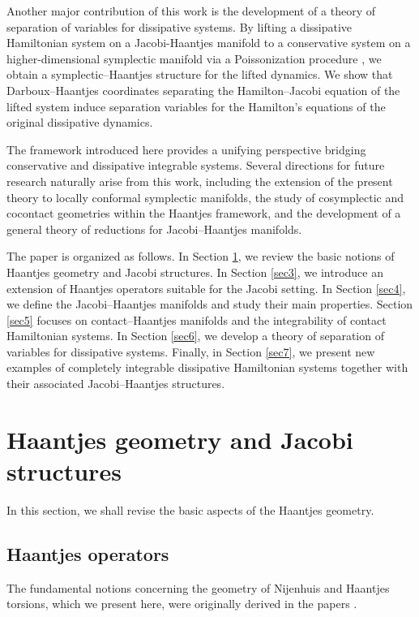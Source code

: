 \documentclass[10pt]{amsart}
\numberwithin{equation}{section}
\theoremstyle{definition}
\begin{document}
Another major contribution of this work is the development of a theory of separation of variables for dissipative systems. By lifting a dissipative Hamiltonian system on a Jacobi-Haantjes manifold to a conservative system on a higher-dimensional symplectic manifold via a Poissonization procedure \cite{TT2016SIGMA,TT2022CMP,RTT2022CNS,RTT2024AMPA}, we obtain a symplectic--Haantjes structure for the lifted dynamics. We show that Darboux–Haantjes coordinates separating the Hamilton–Jacobi equation of the lifted system induce separation variables for the Hamilton's equations of the original dissipative dynamics.
\vspace{2mm}

The framework introduced here provides a unifying perspective bridging conservative and dissipative integrable systems. Several directions for future research naturally arise from this work, including the extension of the present theory to locally conformal symplectic manifolds, the study of cosymplectic and cocontact geometries within the Haantjes framework, and the development of a general theory of reductions for Jacobi--Haantjes manifolds.
\vspace{2mm}

The paper is organized as follows. In Section \ref{sec2}, we review the basic notions of Haantjes geometry and Jacobi structures. In Section \ref{sec3}, we introduce an extension of Haantjes operators suitable for the Jacobi setting. In Section \ref{sec4}, we define the Jacobi--Haantjes manifolds and study their main properties. Section \ref{sec5} focuses on contact–Haantjes manifolds and the integrability of contact Hamiltonian systems. In Section \ref{sec6}, we develop a theory of separation of variables for dissipative systems. Finally, in Section \ref{sec7}, we present new examples of completely integrable dissipative Hamiltonian systems together with their associated Jacobi--Haantjes structures.





\section{Haantjes geometry and Jacobi structures}
\label{sec2}

In this section, we shall revise the basic aspects of the Haantjes geometry. 



\subsection{Haantjes operators}
\label{subsec:2.1}
The fundamental notions concerning the geometry of Nijenhuis and Haantjes torsions, which we present here, were originally derived in the papers \cite{Haa1955,Nij1951,FN1956}.
\vspace{2mm}
\end{document}
